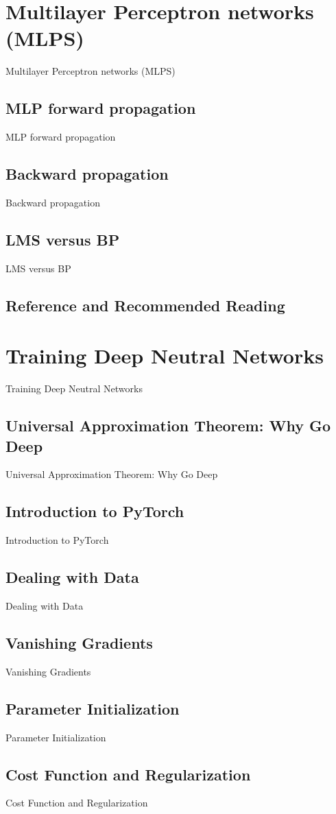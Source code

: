 \documentclass[a4paper,12pt]{article}
\begin{document}
\clearpage
\section{Multilayer Perceptron networks (MLPS)}
Multilayer Perceptron networks (MLPS)
\subsection{MLP forward propagation}
MLP forward propagation
\subsection{Backward propagation}
Backward propagation
\subsection{LMS versus BP}
LMS versus BP
\subsection{Reference and Recommended Reading}

\clearpage
\section{Training Deep Neutral Networks}
Training Deep Neutral Networks
\subsection{Universal Approximation Theorem: Why Go Deep}
Universal Approximation Theorem: Why Go Deep
\subsection{Introduction to PyTorch}
Introduction to PyTorch
\subsection{Dealing with Data}
Dealing with Data
\subsection{Vanishing Gradients}
Vanishing Gradients
\subsection{Parameter Initialization}
Parameter Initialization
\subsection{Cost Function and Regularization}
Cost Function and Regularization
\end{document}
